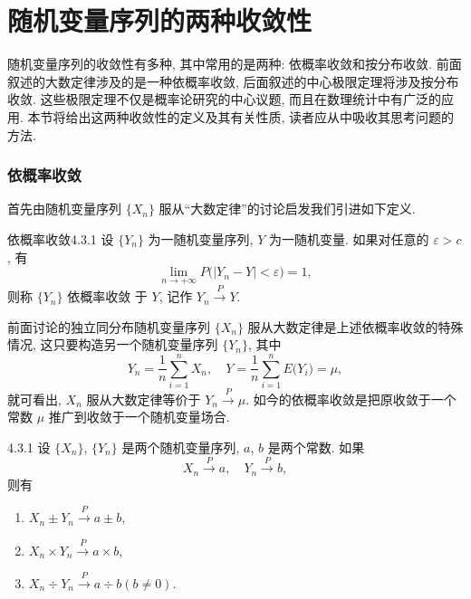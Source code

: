 \section{随机变量序列的两种收敛性}

随机变量序列的收敛性有多种, 其中常用的是两种: 依概率收敛和按分布收敛.
前面叙述的大数定律涉及的是一种依概率收敛, 后面叙述的中心极限定理将涉及按分布收敛.
这些极限定理不仅是概率论研究的中心议题, 而且在数理统计中有广泛的应用.
本节将给出这两种收敛性的定义及其有关性质, 读者应从中吸收其思考问题的方法.

\subsubsection{依概率收敛}

首先由随机变量序列 $ \{ X_n \} $ 服从``大数定律''的讨论启发我们引进如下定义.

\begin{definition}{依概率收敛}{4.3.1}
    设 $ \{ Y_n \} $ 为一随机变量序列, $ Y $ 为一随机变量.
    如果对任意的 $ \varepsilon > c $, 有
    \begin{equation}\label{eq:4.3.1}
        \lim_{n \to +\infty} P \bigl( \bigr\lvert Y_n - Y \bigr\rvert < \varepsilon \bigr) = 1,
    \end{equation}
    则称 $ \{ Y_n \} $ {\heiti 依概率收敛} 于 $ Y $, 记作 $ Y_n \stackrel{P}{\to} Y $.
\end{definition}

前面讨论的独立同分布随机变量序列 $ \{ X_n \} $ 服从大数定律是上述依概率收敛的特殊情况, 这只要构造另一个随机变量序列 $ \{ Y_n \} $, 其中
\begin{equation*}
    Y_n = \frac{1}{n} \sum_{i=1}^n X_n, \quad Y = \frac{1}{n} \sum_{i=1}^n E \bigl( Y_i \bigr) = \mu,
\end{equation*}
就可看出, $ X_n $ 服从大数定律等价于 $ Y_n \stackrel{P}{\to} \mu $.
如今的依概率收敛是把原收敛于一个常数 $ \mu $ 推广到收敛于一个随机变量场合.

\begin{theorem}{}{4.3.1}
    设 $ \{ X_n \} $, $ \{ Y_n \} $ 是两个随机变量序列, $ a $, $ b $ 是两个常数.
    如果
    \begin{equation*}
        X_n \stackrel{P}{\to} a, \quad Y_n \stackrel{P}{\to} b,
    \end{equation*}
    则有
    \begin{enumerate}
        \item $ X_n \pm Y_n \stackrel{P}{\to} a \pm b $,
        \item $ X_n \times Y_n \stackrel{P}{\to} a \times b $,
        \item $ X_n \div Y_n \stackrel{P}{\to} a \div b (b \neq 0) $.
    \end{enumerate}
\end{theorem}

